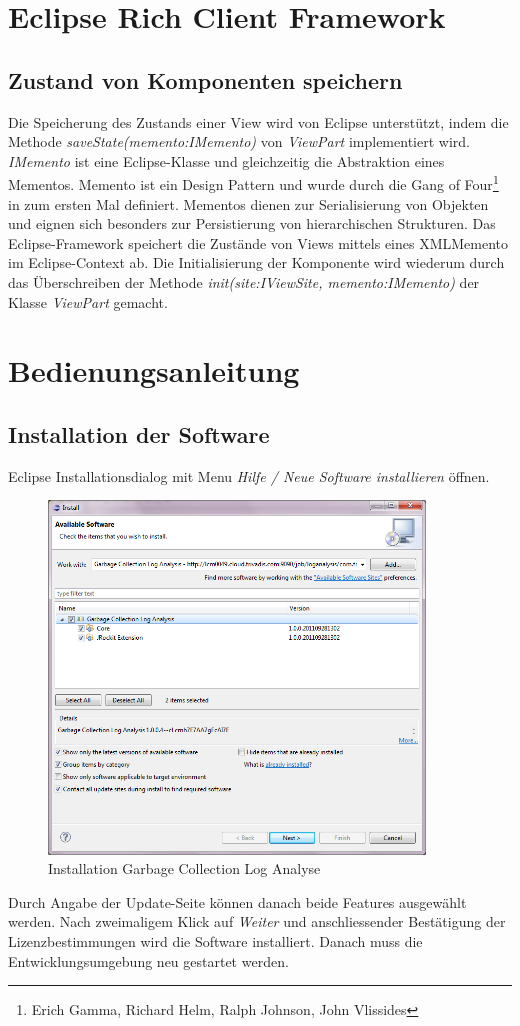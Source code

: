 \chapter{Eclipse Rich Client Framework}
\section*{Zustand von Komponenten speichern}\label{memento}
Die Speicherung des Zustands einer View wird von Eclipse unterstützt, indem die Methode \textit{saveState(memento:IMemento)} von \textit{ViewPart} implementiert wird. \textit{IMemento} ist eine Eclipse-Klasse und gleichzeitig die Abstraktion eines Mementos. Memento ist ein Design Pattern und wurde durch die Gang of Four\footnote{Erich Gamma, Richard Helm, Ralph Johnson, John Vlissides} in \cite[S. 283]{gamma1995design} zum ersten Mal definiert. Mementos dienen zur Serialisierung von Objekten und eignen sich besonders zur Persistierung von hierarchischen Strukturen. Das Eclipse-Framework speichert die Zustände von Views mittels eines XMLMemento im Eclipse-Context ab. Die Initialisierung der Komponente wird wiederum durch das Überschreiben der Methode \textit{init(site:IViewSite, memento:IMemento)} der Klasse \textit{ViewPart} gemacht.

\chapter{Bedienungsanleitung}\label{bedienungsanleitung}
\section*{Installation der Software}
Eclipse Installationsdialog mit Menu \textit{Hilfe / Neue Software installieren} öffnen.
 \begin{figure}[H]
  	\centering
    	\includegraphics[width=10cm]{images/tutorial_install01}
        	\caption{Installation Garbage Collection Log Analyse}
\end{figure}
Durch Angabe der Update-Seite können danach beide Features ausgewählt werden. Nach zweimaligem Klick auf \textit{Weiter} und anschliessender Bestätigung der Lizenzbestimmungen wird die Software installiert. Danach muss die Entwicklungsumgebung neu gestartet werden.


